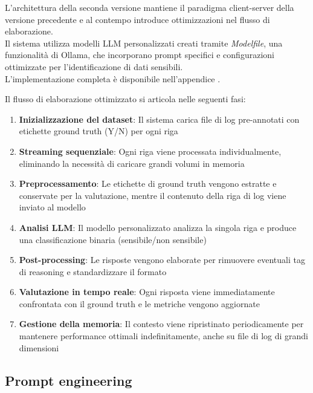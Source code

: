 \documentclass[12pt]{report}
\begin{document}
L'architettura della seconda versione mantiene il paradigma client-server della versione precedente e al contempo introduce ottimizzazioni nel flusso di elaborazione. \\
Il sistema utilizza modelli LLM personalizzati creati tramite \textit{Modelfile}, una funzionalità di Ollama, che incorporano prompt specifici e configurazioni ottimizzate per l'identificazione di dati sensibili.\\
L'implementazione completa è disponibile nell'appendice .

Il flusso di elaborazione ottimizzato si articola nelle seguenti fasi:

\begin{enumerate}
    \item \textbf{Inizializzazione del dataset}: Il sistema carica file di log pre-annotati con etichette ground truth (Y/N) per ogni riga
    \item \textbf{Streaming sequenziale}: Ogni riga viene processata individualmente, eliminando la necessità di caricare grandi volumi in memoria
    \item \textbf{Preprocessamento}: Le etichette di ground truth vengono estratte e conservate per la valutazione, mentre il contenuto della riga di log viene inviato al modello
    \item \textbf{Analisi LLM}: Il modello personalizzato analizza la singola riga e produce una classificazione binaria (sensibile/non sensibile)
    \item \textbf{Post-processing}: Le risposte vengono elaborate per rimuovere eventuali tag di reasoning e standardizzare il formato
    \item \textbf{Valutazione in tempo reale}: Ogni risposta viene immediatamente confrontata con il ground truth e le metriche vengono aggiornate
    \item \textbf{Gestione della memoria}: Il contesto viene ripristinato periodicamente per mantenere performance ottimali indefinitamente, anche su file di log di grandi dimensioni
\end{enumerate}

\subsection{Prompt engineering}
\label{subsec:ver2_prompt_engineering}
\end{document}
